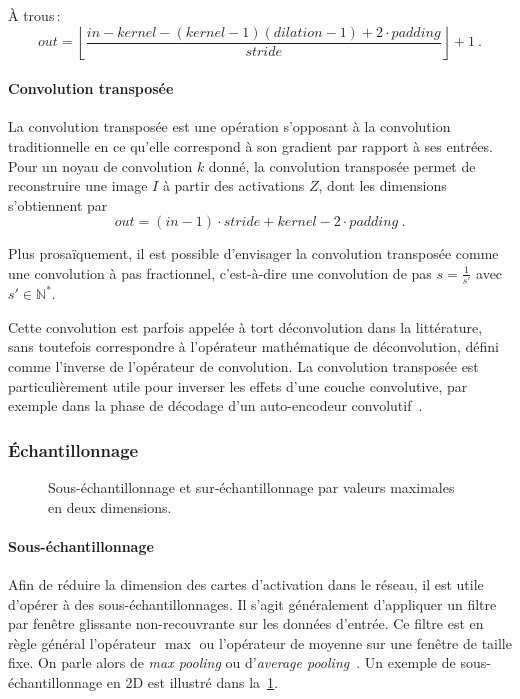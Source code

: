 À trous\,:
$$\mathit{out} = \left\lfloor \frac{\mathit{in} - \mathit{kernel} - (\mathit{kernel} -1)(\mathit{dilation} - 1) + 2 \cdot \mathit{padding}}{\mathit{stride}}\right\rfloor + 1~.$$


\paragraph{Convolution transposée}

La convolution transposée est une opération s'opposant à la convolution traditionnelle en ce qu'elle correspond à son gradient par rapport à ses entrées. Pour un noyau de convolution $k$ donné, la convolution transposée permet de reconstruire une image $I$ à partir des activations $Z$, dont les dimensions s'obtiennent par
$$\mathit{out} = (\mathit{in} - 1) \cdot \mathit{stride} + \mathit{kernel} - 2 \cdot \mathit{padding}~.$$

Plus prosaïquement, il est possible d'envisager la convolution transposée comme une convolution à pas fractionnel, c'est-à-dire une convolution de pas $s = \frac{1}{s'}$ avec $s' \in \mathbb{N}^*$.

Cette convolution est parfois appelée à tort \og déconvolution \fg dans la littérature, sans toutefois correspondre à l'opérateur mathématique de déconvolution, défini comme l'inverse de l'opérateur de convolution. La convolution transposée est particulièrement utile pour inverser les effets d'une couche convolutive, par exemple dans la phase de décodage d'un auto-encodeur convolutif~\cite{zhao_stacked_2015}.

\subsubsection{Échantillonnage}

\begin{figure}
  \resizebox{\textwidth}{!}{
  
  }
  \caption{Sous-échantillonnage et sur-échantillonnage par valeurs maximales en deux dimensions.}
  \label{fig:pooling}
\end{figure}

\paragraph{Sous-échantillonnage}

Afin de réduire la dimension des cartes d'activation dans le réseau, il est utile d'opérer à des sous-échantillonnages. Il s'agit généralement d'appliquer un filtre par fenêtre glissante non-recouvrante sur les données d'entrée. Ce filtre est en règle général l'opérateur $\max$ ou l'opérateur de moyenne sur une fenêtre de taille fixe. On parle alors de \emph{max pooling} ou d'\emph{average pooling}~\cite{zhou_stereo_1988}. Un exemple de sous-échantillonnage en 2D est illustré dans la~\cref{fig:pooling}.

